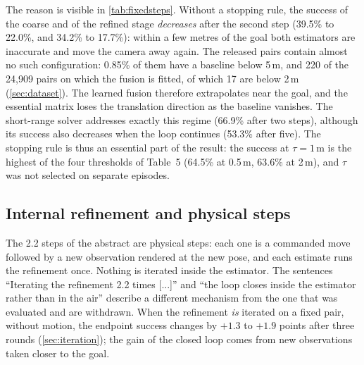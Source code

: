 \documentclass[10pt,twocolumn,letterpaper]{article}
\begin{document}
The reason is visible in \cref{tab:fixedsteps}. Without a stopping rule, the success of the coarse and of the refined stage \emph{decreases} after the second step (39.5\% to 22.0\%, and 34.2\% to 17.7\%): within a few metres of the goal both estimators are inaccurate and move the camera away again. The released pairs contain almost no such configuration: 0.85\% of them have a baseline below 5\,m, and 220 of the 24{,}909 pairs on which the fusion is fitted, of which 17 are below 2\,m (\cref{sec:dataset}). The learned fusion therefore extrapolates near the goal, and the essential matrix loses the translation direction as the baseline vanishes. The short-range solver addresses exactly this regime (66.9\% after two steps), although its success also decreases when the loop continues (53.3\% after five). The stopping rule is thus an essential part of the result: the success at $\tau{=}1$\,m is the highest of the four thresholds of Table~5 (64.5\% at 0.5\,m, 63.6\% at 2\,m), and $\tau$ was not selected on separate episodes.

\subsection{Internal refinement and physical steps}
\label{sec:internalphysical}

The 2.2 steps of the abstract are physical steps: each one is a commanded move followed by a new observation rendered at the new pose, and each estimate runs the refinement once. Nothing is iterated inside the estimator. The sentences ``Iterating the refinement 2.2 times [...]'' and ``the loop closes inside the estimator rather than in the air'' describe a different mechanism from the one that was evaluated and are withdrawn. When the refinement \emph{is} iterated on a fixed pair, without motion, the endpoint success changes by \ensuremath{+1.3}{} to \ensuremath{+1.9}{} points after three rounds (\cref{sec:iteration}); the gain of the closed loop comes from new observations taken closer to the goal.
\end{document}
